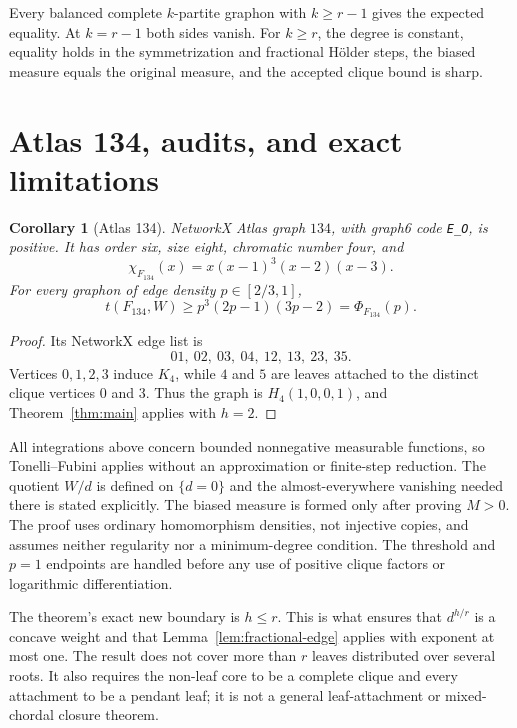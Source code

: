\documentclass[11pt]{article}
\newtheorem{corollary}[theorem]{Corollary}
\begin{document}
Every balanced complete $k$-partite graphon with $k\geq r-1$ gives the
expected equality.  At $k=r-1$ both sides vanish.  For $k\geq r$, the degree
is constant, equality holds in the symmetrization and fractional H\"older
steps, the biased measure equals the original measure, and the accepted
clique bound is sharp.


\section{Atlas 134, audits, and exact limitations}

\begin{corollary}[Atlas 134]
NetworkX Atlas graph $134$, with graph6 code \texttt{E\_O}, is
positive.  It has order six, size eight, chromatic number four, and
\[
 \chi_{F_{134}}(x)=x(x-1)^3(x-2)(x-3).
\]
For every graphon of edge density $p\in[2/3,1]$,
\[
 t(F_{134},W)
 \geq p^3(2p-1)(3p-2)
 =\Phi_{F_{134}}(p).
\]
\end{corollary}

\begin{proof}
Its NetworkX edge list is
\[
 01,\ 02,\ 03,\ 04,\ 12,\ 13,\ 23,\ 35.
\]
Vertices $0,1,2,3$ induce $K_4$, while $4$ and $5$ are leaves attached to
the distinct clique vertices $0$ and $3$.  Thus the graph is
$H_4(1,0,0,1)$, and Theorem~\ref{thm:main} applies with $h=2$.
\end{proof}

All integrations above concern bounded nonnegative measurable functions, so
Tonelli--Fubini applies without an approximation or finite-step reduction.
The quotient $W/d$ is defined on $\{d=0\}$ and the almost-everywhere
vanishing needed there is stated explicitly.  The biased measure is formed
only after proving $M>0$.  The proof uses ordinary homomorphism densities,
not injective copies, and assumes neither regularity nor a minimum-degree
condition.  The threshold and $p=1$ endpoints are handled before any use of
positive clique factors or logarithmic differentiation.

The theorem's exact new boundary is $h\leq r$.  This is what ensures that
$d^{h/r}$ is a concave weight and that Lemma~\ref{lem:fractional-edge}
applies with exponent at most one.  The result does not cover more than $r$
leaves distributed over several roots.  It also requires the non-leaf core
to be a complete clique and every attachment to be a pendant leaf; it is not
a general leaf-attachment or mixed-chordal closure theorem.
\end{document}
